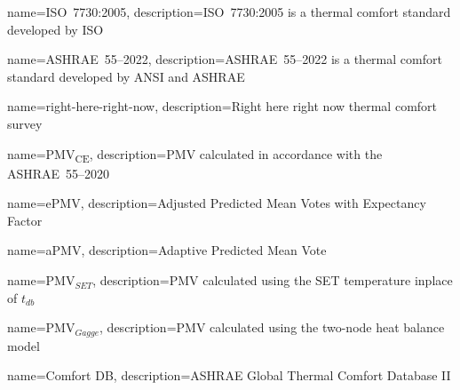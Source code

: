 \usepackage[nonumberlist,nogroupskip]{glossaries}


{
name={ISO~7730:2005},
description={ISO~7730:2005 is a thermal comfort standard developed by ISO}
}

{
name={ASHRAE~55--2022},
description={ASHRAE~55--2022 is a thermal comfort standard developed by ANSI and ASHRAE}
}

{
name={right-here-right-now},
description={Right here right now thermal comfort survey}
}

{
name={PMV\textsubscript{CE}},
description={PMV calculated in accordance with the ASHRAE~55--2020}
}

{
name={ePMV},
description={Adjusted Predicted Mean Votes with Expectancy Factor}
}

{
name={aPMV},
description={Adaptive Predicted Mean Vote}
}

{
name={PMV$_{SET}$},
description={PMV calculated using the SET temperature inplace of $t_{db}$}
}

{
name={PMV$_{Gagge}$},
description={PMV calculated using the two-node heat balance model}
}

{
name={Comfort DB},
description={ASHRAE Global Thermal Comfort Database II}
}

\makenoidxglossaries